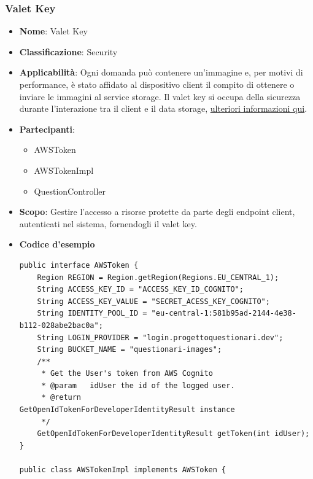 \documentclass[12pt]{article}
\begin{document}
\subsubsection{Valet Key}
    	\begin{itemize}
            \item \textbf{Nome}: Valet Key
            \item \textbf{Classificazione}: Security
            \item \textbf{Applicabilità}: Ogni domanda può contenere un'immagine e, per motivi di performance, è stato affidato al dispositivo client il compito di ottenere o inviare le immagini al service storage. Il valet key si occupa della sicurezza durante l'interazione tra il client e il data storage, \hyperref[sec:valet]{ulteriori informazioni qui}.
            \item \textbf{Partecipanti}:
                \begin{itemize}
                    \item {AWSToken}
                    \item {AWSTokenImpl}
                    \item {QuestionController}
                \end{itemize}
            \item \textbf{Scopo}: Gestire l'accesso a risorse protette da parte degli endpoint client, autenticati nel sistema, fornendogli il valet key.
             \item \textbf{Codice d'esempio}
             \begin{lstlisting}
public interface AWSToken {
    Region REGION = Region.getRegion(Regions.EU_CENTRAL_1);
    String ACCESS_KEY_ID = "ACCESS_KEY_ID_COGNITO";
    String ACCESS_KEY_VALUE = "SECRET_ACESS_KEY_COGNITO";
    String IDENTITY_POOL_ID = "eu-central-1:581b95ad-2144-4e38-b112-028abe2bac0a";
    String LOGIN_PROVIDER = "login.progettoquestionari.dev";
    String BUCKET_NAME = "questionari-images";
    /**
     * Get the User's token from AWS Cognito
     * @param	idUser the id of the logged user.
     * @return				GetOpenIdTokenForDeveloperIdentityResult instance
     */
    GetOpenIdTokenForDeveloperIdentityResult getToken(int idUser);
}

public class AWSTokenImpl implements AWSToken {


\end{lstlisting}
\end{itemize}
\end{document}
